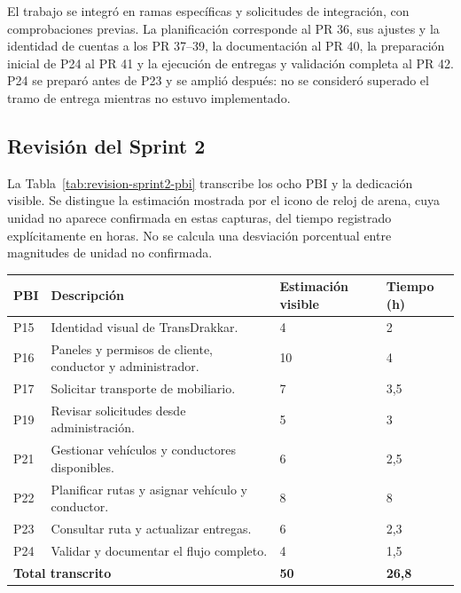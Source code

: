 El trabajo se integró en ramas específicas y solicitudes de integración, con comprobaciones previas. La planificación corresponde al PR 36, sus ajustes y la identidad de cuentas a los PR 37--39, la documentación al PR 40, la preparación inicial de P24 al PR 41 y la ejecución de entregas y validación completa al PR 42. P24 se preparó antes de P23 y se amplió después: no se consideró superado el tramo de entrega mientras no estuvo implementado.

\clearpage
\subsection{Revisión del Sprint 2}
La Tabla~\ref{tab:revision-sprint2-pbi} transcribe los ocho PBI y la dedicación visible. Se distingue la estimación mostrada por el icono de reloj de arena, cuya unidad no aparece confirmada en estas capturas, del tiempo registrado explícitamente en horas. No se calcula una desviación porcentual entre magnitudes de unidad no confirmada.

\begin{center}
\begin{minipage}{\textwidth}
\centering\small
\renewcommand{\arraystretch}{1.2}
\begin{tabular}{|p{}|p{}|p{}|p{}|}
\hline
\textbf{PBI} & \textbf{Descripción} & \textbf{Estimación visible} & \textbf{Tiempo (h)} \\ \hline
P15 & Identidad visual de TransDrakkar. & 4 & 2 \\ \hline
P16 & Paneles y permisos de cliente, conductor y administrador. & 10 & 4 \\ \hline
P17 & Solicitar transporte de mobiliario. & 7 & 3,5 \\ \hline
P19 & Revisar solicitudes desde administración. & 5 & 3 \\ \hline
P21 & Gestionar vehículos y conductores disponibles. & 6 & 2,5 \\ \hline
P22 & Planificar rutas y asignar vehículo y conductor. & 8 & 8 \\ \hline
P23 & Consultar ruta y actualizar entregas. & 6 & 2,3 \\ \hline
P24 & Validar y documentar el flujo completo. & 4 & 1,5 \\ \hline
\multicolumn{2}{|l|}{\textbf{Total transcrito}} & \textbf{50} & \textbf{26,8} \\ \hline
\end{tabular}
\captionsetup{hypcap=false}
\label{tab:revision-sprint2-pbi}
\end{minipage}
\end{center}


